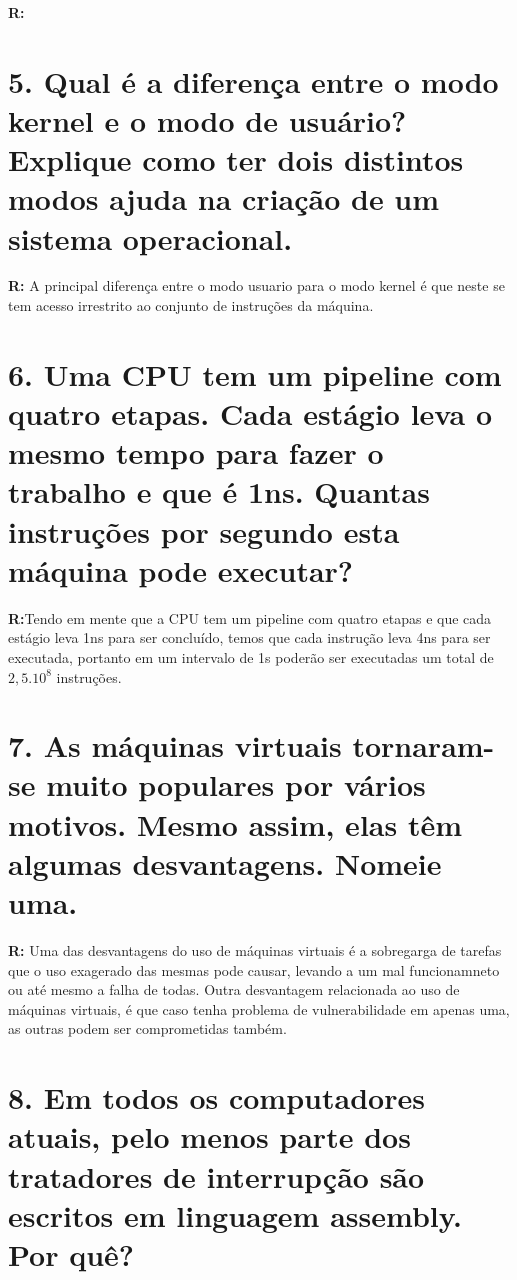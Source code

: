 \documentclass{article}
\begin{document}
\medskip
\noindent
\textbf{R:}

\section*{5. \large Qual é a diferença entre o modo kernel e o modo de usuário? Explique como ter dois distintos modos ajuda na criação de um sistema operacional.}

\medskip
\noindent
\textbf{R:} A principal diferença entre o modo usuario para o modo kernel é que neste se tem acesso irrestrito ao conjunto de instruções da máquina.

\section*{6. \large Uma CPU tem um pipeline com quatro etapas. Cada estágio leva o mesmo tempo para fazer o trabalho e que é 1ns. Quantas instruções por segundo esta máquina pode executar?}

\medskip
\noindent
\textbf{R:}Tendo em mente que a CPU tem um pipeline com quatro etapas e que cada estágio leva 1ns para ser concluído, temos que cada instrução leva 4ns para ser executada, portanto em um intervalo de 1s poderão ser executadas um total de $2,5.10^8$ instruções.

\section*{7. \large As máquinas virtuais tornaram-se muito populares por vários motivos. Mesmo assim, elas têm algumas desvantagens. Nomeie uma.}

\medskip
\noindent
\textbf{R:} Uma das desvantagens do uso de máquinas virtuais é a sobregarga de tarefas que o uso exagerado das mesmas pode causar, levando a um mal funcionamneto ou até mesmo a falha de todas. Outra desvantagem relacionada ao uso de máquinas virtuais, é que caso tenha problema de vulnerabilidade em apenas uma, as outras podem ser comprometidas também.

\section*{8. \large Em todos os computadores atuais, pelo menos parte dos tratadores de interrupção são escritos em linguagem assembly. Por quê?}
\end{document}
